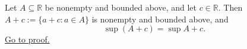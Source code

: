 \begin{theorem}
\label{thm:translation-invariance-supremum}
Let $A\subseteq\mathbb{R}$ be nonempty and bounded above, and let
$c\in\mathbb{R}$.  Then $A+c:=\{a+c:a\in A\}$ is nonempty and bounded above,
and
\[
  \sup(A+c)=\sup A+c.
\]
\hyperref[prf:translation-invariance-supremum]{Go to proof.}
\end{theorem}